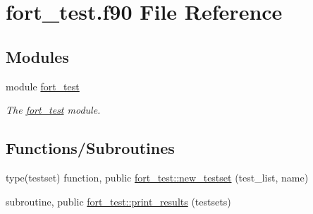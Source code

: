 \hypertarget{fort__test_8f90}{}\section{fort\+\_\+test.\+f90 File Reference}
\label{fort__test_8f90}
\subsection*{Modules}
\begin{DoxyCompactItemize}
\item 
module \hyperlink{namespacefort__test}{fort\+\_\+test}
\begin{DoxyCompactList}\small\item\em The \hyperlink{namespacefort__test}{fort\+\_\+test} module. \end{DoxyCompactList}\end{DoxyCompactItemize}
\subsection*{Functions/\+Subroutines}
\begin{DoxyCompactItemize}
\item 
type(testset) function, public \hyperlink{namespacefort__test_ac1b02a037c4855a5530ae89a6e70cace}{fort\+\_\+test\+::new\+\_\+testset} (test\+\_\+list, name)
\item 
subroutine, public \hyperlink{namespacefort__test_ab48fbb70a5c3df67c8965725d8a6f8e2}{fort\+\_\+test\+::print\+\_\+results} (testsets)
\end{DoxyCompactItemize}
